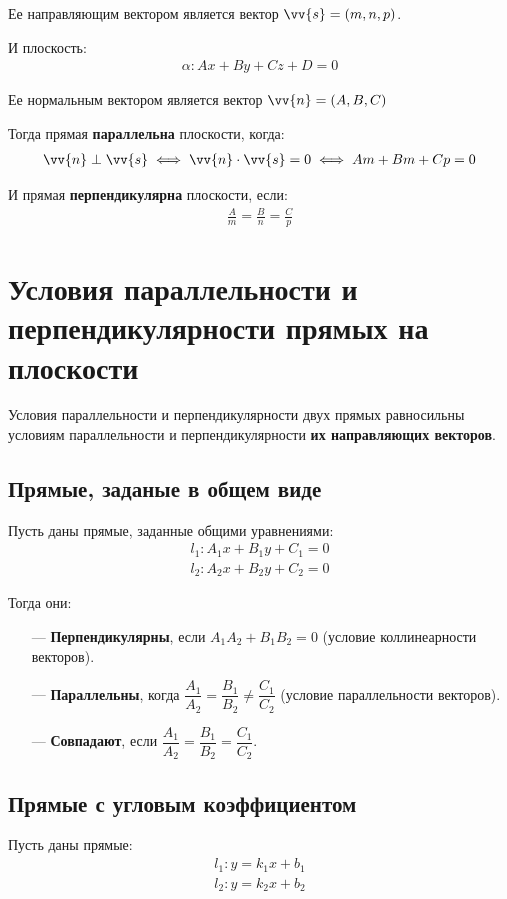 \documentclass[a4paper,12pt,oneside]{extbook}
\theoremstyle{numbered}
\theoremstyle{unnumbered}
\theoremstyle{named}
\theoremstyle{unnumbered}
\theoremstyle{named}
\theoremstyle{named}
\theoremstyle{named}
\begin{document}
Ее направляющим вектором является вектор \(\vv{s} = (m, n, p)\).

И плоскость:
\begin{gather*}
    \alpha: Ax + By + Cz + D = 0
\end{gather*}

Ее нормальным вектором является вектор \(\vv{n} = (A, B, C)\)

Тогда прямая \textbf{параллельна} плоскости, когда:
\begin{gather*}
    \vv{n} \perp \vv{s} \iff \vv{n} \cdot \vv{s} = 0 \iff Am + Bm + Cp = 0
\end{gather*}

И прямая \textbf{перпендикулярна} плоскости, если:
\begin{gather*}
    \frac{A}{m} = \frac{B}{n} = \frac{C}{p}
\end{gather*}

\section{Условия параллельности и перпендикулярности прямых на плоскости}
\label{sec:parallel_perpendicular_lines}

Условия параллельности и перпендикулярности двух прямых равносильны условиям параллельности и перпендикулярности \textbf{их направляющих векторов}.

\subsection{Прямые, заданые в общем виде}
Пусть даны прямые, заданные общими уравнениями:
\begin{gather*}
    l_1: A_1x + B_1y + C_1 = 0 \\
    l_2: A_2x + B_2y + C_2 = 0
\end{gather*}

Тогда они:
\begin{itemize}
    \item[—]{\textbf{Перпендикулярны}, если \(A_1A_2 + B_1B_2 = 0\) (условие коллинеарности векторов).}
    \item[—]{\textbf{Параллельны}, когда \(\dfrac{A_1}{A_2} = \dfrac{B_1}{B_2} \neq \dfrac{C_1}{C_2}\) (условие параллельности векторов).}
    \item[—]{\textbf{Совпадают}, если \(\dfrac{A_1}{A_2} = \dfrac{B_1}{B_2} = \dfrac{C_1}{C_2}\).}
\end{itemize}

\subsection{Прямые с угловым коэффициентом}
Пусть даны прямые:
\begin{gather*}
    l_1: y = k_1x + b_1 \\
    l_2: y = k_2x + b_2
\end{gather*}
\end{document}
